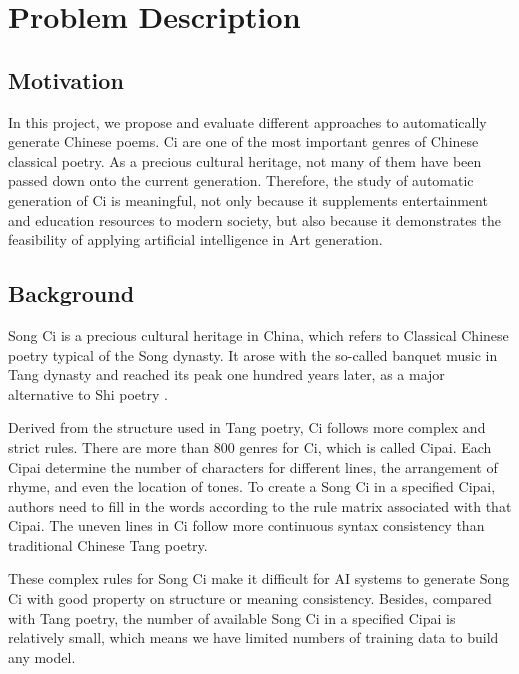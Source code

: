 \section{Problem Description}
\subsection{Motivation}
%
In this project, we propose and evaluate different approaches to automatically generate Chinese poems.
%
Ci are one of the most important genres of Chinese classical poetry.
%
As a precious cultural heritage, not many of them have been passed down onto the current generation.
%
Therefore, the study of automatic generation of Ci is meaningful, not only because it supplements entertainment and education resources to modern society, but also because it demonstrates the feasibility of applying artificial intelligence in Art generation.
%

\subsection{Background}
Song Ci is a precious cultural heritage in China, which refers to Classical Chinese poetry typical of the Song dynasty.
%
It arose with the so-called banquet music in Tang dynasty and reached its peak one hundred years later, as a major alternative to Shi poetry\cite{cai2008chinesepoetry} .


Derived from the structure used in Tang poetry, Ci follows more complex and strict rules.
%
There are more than 800 genres for Ci, which is called Cipai\cite{wikici}.
%
Each Cipai determine the number of characters for different lines, the arrangement of rhyme, and even the location of tones.
%
To create a Song Ci in a specified Cipai, authors need to fill in the words according to the rule matrix associated with that Cipai.
 The uneven lines in Ci follow more continuous syntax consistency than traditional Chinese Tang poetry\cite{cai2008chinesepoetry}.

These complex rules for Song Ci make it difficult for AI systems to generate Song Ci with good property on structure or meaning consistency.
%
Besides, compared with Tang poetry, the number of available Song Ci in a specified Cipai is relatively small\cite{}, which means we have limited numbers of training data to build any model.


